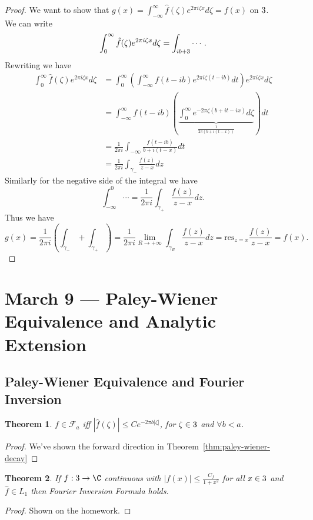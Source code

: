 \documentclass[a4paper]{article}
\newtheorem{thm}{Theorem}[section]
\begin{document}
\begin{proof}
    We want to show that $g(x)=\int_{-\infty}^\infty \hat{f}(\zeta)e^{2\pi i \zeta x}d\zeta=f(x)$ on $3$. \\
    We can write 
    \[
        \int_{0}^\infty \hat{f}(\zeta)e^{2\pi i \zeta x}d\zeta=\int_{ib+3}\cdots
    .\] 
    Rewriting we have 
    \begin{align*}
        \int_{0}^\infty \hat{f}(\zeta)e^{2\pi i \zeta x}d\zeta&=\int_0^\infty \left( \int_{-\infty}^\infty f(t-ib)e^{2\pi i \zeta (t-ib)}dt \right) e^{2\pi i \zeta x}d\zeta\\
        &=\int_{-\infty}^\infty f(t-ib) \left( \underbrace{\int_0^\infty e^{-2\pi \zeta(b+it-ix)} d\zeta }_{ \frac{1}{2\pi (b+i(t-x))}}\right)dt \\
        &=\frac{1}{2\pi i}\int_{-\infty} \frac{f(t-ib)}{b+i(t-x)}dt\\
        &= \frac{1}{2\pi i} \int_{\gamma_-} \frac{f(z)}{z-x}dz
    \end{align*}
    Similarly for the negative side of the integral we have 
    \[
    \int_{-\infty}^0 \cdots = \frac{1}{2\pi i} \int_{\gamma_+} \frac{f(z)}{z-x}dz
    .\] 
    Thus we have 
    \[
    g(x)= \frac{1}{2\pi i} \left( \int_{\gamma_-}+\int_{\gamma_+} \right)= \frac{1}{2\pi i} \lim_{R\to +\infty} \int_{\gamma_R} \frac{f(z)}{z-x}dz= \text{res}_{z=x} \frac{f(z)}{z-x}=f(x)
    .\] 
\end{proof}
\newpage
\section{March 9 --- Paley-Wiener Equivalence and Analytic Extension}
\subsection{Paley-Wiener Equivalence and Fourier Inversion}
\begin{thm}
    $f\in \mathcal{F}_a$ iff $|\hat{f}(\zeta)|\leq C e^{-2\pi b |\zeta|}$, for $\zeta\in 3$ and $\forall b<a$. 
\end{thm}
\begin{proof}
    We've shown the forward direction in Theorem~\ref{thm:paley-wiener-decay}
\end{proof}
\begin{thm}
    If $f:\R\to \C$ continuous with $|f(x)|\leq \frac{C_f}{1+x^2}$ for all $x\in 3$ and $\hat{f}\in L_1$ then Fourier Inversion Formula holds.
\end{thm}
\begin{proof}
    Shown on the homework. 
\end{proof}
\end{document}
